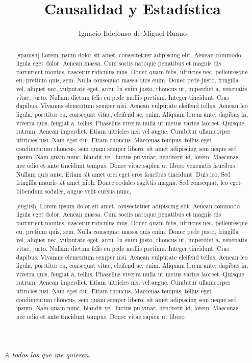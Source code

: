 \documentclass[a4paper,11pt,spanish, twoside]{tfg-uam-matematicas_25-26}
\title{Causalidad y Estadística}
\author{Ignacio Ildefonso de Miguel Ruano}
\theoremstyle{definition}
\begin{document}
\frontmatter
\cleardoublepage
\null
\vfill
\begin{flushright}
    \textit{A todos los que me quieren.}
\end{flushright}
\vfill
\cleardoublepage

\begin{abstract}[spanish]
Lorem ipsum dolor sit amet, consectetuer adipiscing elit. Aenean commodo ligula eget dolor. Aenean massa. Cum sociis natoque penatibus et magnis dis parturient montes, nascetur ridiculus mus. Donec quam felis, ultricies nec, pellentesque eu, pretium quis, sem. Nulla consequat massa quis enim. Donec pede justo, fringilla vel, aliquet nec, vulputate eget, arcu. In enim justo, rhoncus ut, imperdiet a, venenatis vitae, justo. Nullam dictum felis eu pede mollis pretium. Integer tincidunt. Cras dapibus. Vivamus elementum semper nisi. Aenean vulputate eleifend tellus. Aenean leo ligula, porttitor eu, consequat vitae, eleifend ac, enim. Aliquam lorem ante, dapibus in, viverra quis, feugiat a, tellus. Phasellus viverra nulla ut metus varius laoreet. Quisque rutrum. Aenean imperdiet. Etiam ultricies nisi vel augue. Curabitur ullamcorper ultricies nisi. Nam eget dui. Etiam rhoncus. Maecenas tempus, tellus eget condimentum rhoncus, sem quam semper libero, sit amet adipiscing sem neque sed ipsum. Nam quam nunc, blandit vel, luctus pulvinar, hendrerit id, lorem. Maecenas nec odio et ante tincidunt tempus. Donec vitae sapien ut libero venenatis faucibus. Nullam quis ante. Etiam sit amet orci eget eros faucibus tincidunt. Duis leo. Sed fringilla mauris sit amet nibh. Donec sodales sagittis magna. Sed consequat, leo eget bibendum sodales, augue velit cursus nunc,
\end{abstract}
\begin{abstract}[english]
Lorem ipsum dolor sit amet, consectetuer adipiscing elit. Aenean commodo ligula eget dolor. Aenean massa. Cum sociis natoque penatibus et magnis dis parturient montes, nascetur ridiculus mus. Donec quam felis, ultricies nec, pellentesque eu, pretium quis, sem. Nulla consequat massa quis enim. Donec pede justo, fringilla vel, aliquet nec, vulputate eget, arcu. In enim justo, rhoncus ut, imperdiet a, venenatis vitae, justo. Nullam dictum felis eu pede mollis pretium. Integer tincidunt. Cras dapibus. Vivamus elementum semper nisi. Aenean vulputate eleifend tellus. Aenean leo ligula, porttitor eu, consequat vitae, eleifend ac, enim. Aliquam lorem ante, dapibus in, viverra quis, feugiat a, tellus. Phasellus viverra nulla ut metus varius laoreet. Quisque rutrum. Aenean imperdiet. Etiam ultricies nisi vel augue. Curabitur ullamcorper ultricies nisi. Nam eget dui. Etiam rhoncus. Maecenas tempus, tellus eget condimentum rhoncus, sem quam semper libero, sit amet adipiscing sem neque sed ipsum. Nam quam nunc, blandit vel, luctus pulvinar, hendrerit id, lorem. Maecenas nec odio et ante tincidunt tempus. Donec vitae sapien ut libero \end{abstract}
\end{document}
